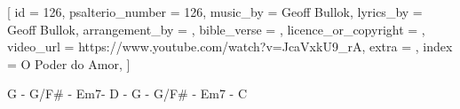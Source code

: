 
[
    id                     = {126},
    psalterio_number       = {126},
    music_by               = {Geoff Bullok},
    lyrics_by              = {Geoff Bullok},
    arrangement_by         = {},
    bible_verse            = {},
    licence_or_copyright   = {},
    video_url              = {https://www.youtube.com/watch?v=JcaVxkU9_rA},
    extra                  = {},
    index                  = {O Poder do Amor},
]


\beginverse*

G - G/F\# - Em7- D - G - G/F\# - Em7 - C

\endverse*


\beginverse

